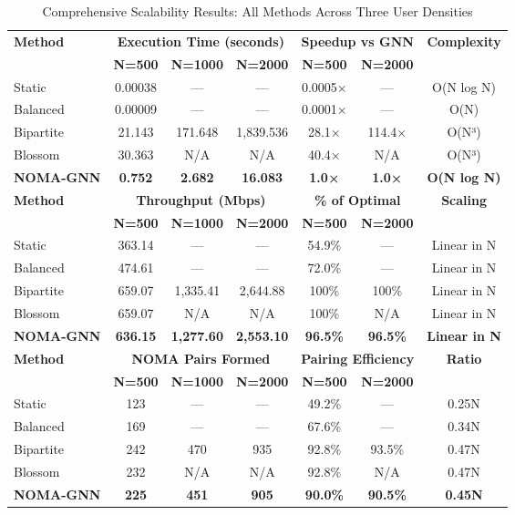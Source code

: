 \begin{table}[h]
\centering
\caption{Comprehensive Scalability Results: All Methods Across Three User Densities}
\label{tab:comprehensive_scalability}
\small
\begin{tabular}{l|ccc|cc|c}
\hline
\textbf{Method} & \multicolumn{3}{c|}{\textbf{Execution Time (seconds)}} & \multicolumn{2}{c|}{\textbf{Speedup vs GNN}} & \textbf{Complexity} \\
 & \textbf{N=500} & \textbf{N=1000} & \textbf{N=2000} & \textbf{N=500} & \textbf{N=2000} & \\
\hline
Static & 0.00038 & --- & --- & 0.0005× & --- & O(N log N) \\
Balanced & 0.00009 & --- & --- & 0.0001× & --- & O(N) \\
Bipartite & 21.143 & 171.648 & 1,839.536 & 28.1× & 114.4× & O(N³) \\
Blossom & 30.363 & N/A & N/A & 40.4× & N/A & O(N³) \\
\textbf{NOMA-GNN} & \textbf{0.752} & \textbf{2.682} & \textbf{16.083} & \textbf{1.0×} & \textbf{1.0×} & \textbf{O(N log N)} \\
\hline
\textbf{Method} & \multicolumn{3}{c|}{\textbf{Throughput (Mbps)}} & \multicolumn{2}{c|}{\textbf{\% of Optimal}} & \textbf{Scaling} \\
 & \textbf{N=500} & \textbf{N=1000} & \textbf{N=2000} & \textbf{N=500} & \textbf{N=2000} & \\
\hline
Static & 363.14 & --- & --- & 54.9\% & --- & Linear in N \\
Balanced & 474.61 & --- & --- & 72.0\% & --- & Linear in N \\
Bipartite & 659.07 & 1,335.41 & 2,644.88 & 100\% & 100\% & Linear in N \\
Blossom & 659.07 & N/A & N/A & 100\% & N/A & Linear in N \\
\textbf{NOMA-GNN} & \textbf{636.15} & \textbf{1,277.60} & \textbf{2,553.10} & \textbf{96.5\%} & \textbf{96.5\%} & \textbf{Linear in N} \\
\hline
\textbf{Method} & \multicolumn{3}{c|}{\textbf{NOMA Pairs Formed}} & \multicolumn{2}{c|}{\textbf{Pairing Efficiency}} & \textbf{Ratio} \\
 & \textbf{N=500} & \textbf{N=1000} & \textbf{N=2000} & \textbf{N=500} & \textbf{N=2000} & \\
\hline
Static & 123 & --- & --- & 49.2\% & --- & 0.25N \\
Balanced & 169 & --- & --- & 67.6\% & --- & 0.34N \\
Bipartite & 242 & 470 & 935 & 92.8\% & 93.5\% & 0.47N \\
Blossom & 232 & N/A & N/A & 92.8\% & N/A & 0.47N \\
\textbf{NOMA-GNN} & \textbf{225} & \textbf{451} & \textbf{905} & \textbf{90.0\%} & \textbf{90.5\%} & \textbf{0.45N} \\
\hline
\end{tabular}
\end{table}


